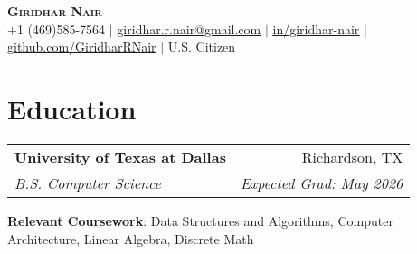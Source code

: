 \documentclass[letterpaper,11pt]{article}
\makeatletter
\newcommand{\resumeSubheading}[4]{
  \vspace{-2pt}\item
    \begin{tabular*}{0.97\textwidth}[t]{l@{\extracolsep{\fill}}r}
      \textbf{#1} & #2 \\
      \textit{\small#3} & \textit{\small #4} \\
    \end{tabular*}\vspace{-7pt}
}
\newcommand{\resumeSubHeadingListStart}{\begin{itemize}[leftmargin=0.15in, label={}]}
\newcommand{\resumeSubHeadingListEnd}{\end{itemize}}
\makeatother
\begin{document}

\begin{center}
    \textbf{\Huge \scshape Giridhar Nair} \\ \vspace{1pt}
    \small +1 (469)585-7564 $|$ \href{mailto:Giridhar.r.nair@gmail.com}{\underline{giridhar.r.nair@gmail.com}} $|$ 
    \href{https://www.linkedin.com/in/giridhar-nair/}{\underline{in/giridhar-nair}} $|$
    \href{https://github.com/GiridharRNair}{\underline{github.com/GiridharRNair}} $|$
    {{U.S. Citizen}}
\end{center}






\section{Education}
    \resumeSubHeadingListStart
        \resumeSubheading
        {University of Texas at Dallas}{Richardson, TX}
        {B.S. Computer Science}{Expected Grad: May 2026}
        \small{\item{
            \textbf{Relevant Coursework}{: Data Structures and Algorithms, Computer Architecture, Linear Algebra, Discrete Math}}}
    \resumeSubHeadingListEnd

\end{document}
